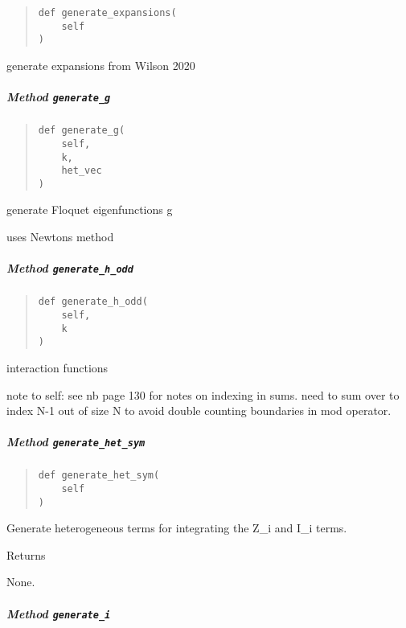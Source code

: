 \documentclass[english,a4paper,oneside]{article}
\let\oldsubparagraph\subparagraph
\renewcommand{\subparagraph}[1]{\oldsubparagraph{#1}\mbox{}}
\begin{document}
\begin{quote}
\begin{verbatim}
def generate_expansions(
    self
)
\end{verbatim}
\end{quote}

generate expansions from Wilson 2020

\hypertarget{StrongCoupling.StrongCoupling.generate_g}{%
\subparagraph{\texorpdfstring{Method
\texttt{generate\_g}}{Method generate\_g}}\label{StrongCoupling.StrongCoupling.generate_g}}

\begin{quote}
\begin{verbatim}
def generate_g(
    self,
    k,
    het_vec
)
\end{verbatim}
\end{quote}

generate Floquet eigenfunctions g

uses Newtons method

\hypertarget{StrongCoupling.StrongCoupling.generate_h_odd}{%
\subparagraph{\texorpdfstring{Method
\texttt{generate\_h\_odd}}{Method generate\_h\_odd}}\label{StrongCoupling.StrongCoupling.generate_h_odd}}

\begin{quote}
\begin{verbatim}
def generate_h_odd(
    self,
    k
)
\end{verbatim}
\end{quote}

interaction functions

note to self: see nb page 130 for notes on indexing in sums. need to sum
over to index N-1 out of size N to avoid double counting boundaries in
mod operator.

\hypertarget{StrongCoupling.StrongCoupling.generate_het_sym}{%
\subparagraph{\texorpdfstring{Method
\texttt{generate\_het\_sym}}{Method generate\_het\_sym}}\label{StrongCoupling.StrongCoupling.generate_het_sym}}

\begin{quote}
\begin{verbatim}
def generate_het_sym(
    self
)
\end{verbatim}
\end{quote}

Generate heterogeneous terms for integrating the Z\_i and I\_i terms.

Returns

None.

\hypertarget{StrongCoupling.StrongCoupling.generate_i}{%
\subparagraph{\texorpdfstring{Method
\texttt{generate\_i}}{Method generate\_i}}\label{StrongCoupling.StrongCoupling.generate_i}}
\end{document}
